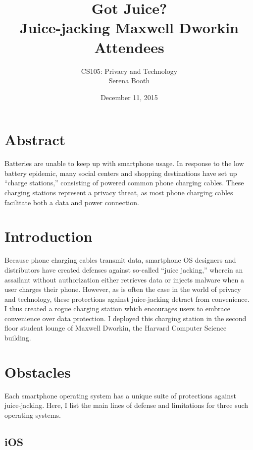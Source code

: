 \documentclass[11pt]{article} %
\title{Got Juice? \\ Juice-jacking Maxwell Dworkin Attendees}
\author{CS105: Privacy and Technology \\ Serena Booth}
\date{December 11, 2015} %
\begin{document}
\maketitle
\doublespacing
\section{Abstract}

Batteries are unable to keep up with smartphone usage. In response to the low battery epidemic, many social centers and shopping destinations have set up ``charge stations,'' consisting of powered common phone charging cables. These charging stations represent a privacy threat, as most phone charging cables facilitate both a data and power connection. 

\section{Introduction}

Because phone charging cables transmit data, smartphone OS designers and distributors have created defenses against so-called ``juice jacking,'' wherein an assailant without authorization either retrieves data or injects malware when a user charges their phone. However, as is often the case in the world of privacy and technology, these protections against juice-jacking detract from convenience. I thus created a rogue charging station which encourages users to embrace convenience over data protection. I deployed this charging station in the second floor student lounge of Maxwell Dworkin, the Harvard Computer Science building. 

\section{Obstacles} 

Each smartphone operating system has a unique suite of protections against juice-jacking. Here, I list the main lines of defense and limitations for three such operating systems. 

\subsection{iOS} 
\end{document}
